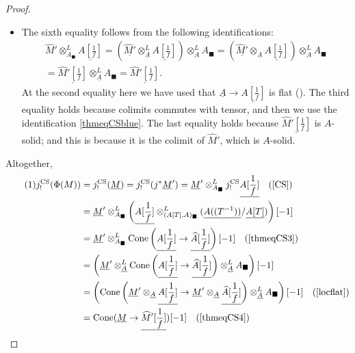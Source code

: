 \documentclass[11pt]{amsart}
\newcommand\numberthis{\addtocounter{equation}{1}\tag{\theequation}}
\newcommand{\ra}{\rightarrow} %
\newcommand{\bbox}{{\blacksquare}}
\newcommand{\CS}{\operatorname{CS}}
\renewcommand{\hat}{\widehat} %
\newcommand{\ul}{\underline}
\theoremstyle{plain}
\theoremstyle{definition}
\numberwithin{equation}{prop}
\begin{document}
\begin{proof}
\begin{itemize}
The fifth equality comes from the fact that $\hat M'$ is a solid $A$-module, as it is the limit of discrete modules.
\item 
The sixth equality follows from the following identifications:
\begin{align*} 
\hat M'\otimes^L_{A_\bbox}\ul{A[\frac{1}{f}]}
=\left(\ul{\hat M'}\otimes^L_{\ul A}\ul{A[\frac{1}{f}]}\right)\otimes^L_{\ul A} A_\bbox
=\left(\ul{\hat M'}\otimes_{\ul A}\ul{A[\frac{1}{f}]}\right)\otimes^L_{\ul A} A_\bbox
\\
=\ul{\hat M'[\frac{1}{f}]}\otimes^L_{\ul A} A_\bbox
=\ul{\hat M'[\frac{1}{f}]}.
\end{align*}
At the second equality here we have used that $\ul A\ra \ul{A[\frac{1}{f}]}$ is flat ().
The third equality holds because colimits commutes with tensor, and then we use the identification \eqref{thmeqCSblue}.
The last equality holds because $\ul{\hat M'[\frac{1}{f}]}$ is $A$-solid; and this is because it is the colimit of $\hat M'$, which is $A$-solid.
\end{itemize}
Altogether,
\begin{align*} 
\numberthis \label{thmeqCS5}
j_!^{\CS}(\Phi(M))&= 
j_!^{\CS}(\ul M)=
j_!^{\CS}(j^*\ul M')
=\ul M'\otimes^L_{A_\bbox} j^{\CS}_!\ul{A[\frac{1}{f}]}
\quad \text{(\cite[Theorem 8.13(iii)]{CS})}
\\
&=\ul M'\otimes^L_{A_\bbox}\left(\ul{A[\frac{1}{f}]}\otimes^L_{(A[T],A)_\bbox} (\ul{A((T^{-1}))}/\ul{A[T]})\right)[-1]
\\
&=\ul M'\otimes^L_{A_\bbox}
{\rm Cone}\left( \ul{A[\frac{1}{f}]}\ra \ul{\hat A[\frac{1}{f}]}\right)[-1]
\quad\text{(\Cref{thmeqCS3})}
\\
&=\left(\ul M'\otimes^L_{\ul A}
{\rm Cone}\left( \ul{A[\frac{1}{f}]}\ra \ul{\hat A[\frac{1}{f}]}\right)\otimes^L_{\ul A}A_\bbox\right)[-1]
\\
&=
\left({\rm Cone}\left( \ul M'\otimes_{\ul A}\ul{A[\frac{1}{f}]}\ra \ul M'\otimes_{\ul A} \ul{\hat A[\frac{1}{f}]}\right)\otimes^L_{\ul A}A_\bbox\right)[-1]
\text{\quad (\Cref{locflat})}
\\
&={\rm Cone}(\ul M\ra \ul{\hat M'[\frac{1}{f}]})[-1]
\quad\text{(\Cref{thmeqCS4})}
\end{align*}






\end{proof}
\end{document}
